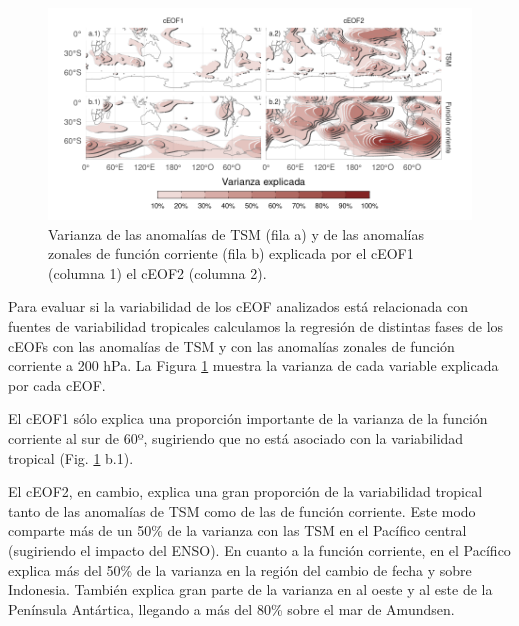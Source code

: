\documentclass[12pt,oneside,a4paper]{reedthesis}
\begin{document}
\begin{figure}

{\centering \includegraphics{figures/20-ceofs/psi-sst-explained-variance-1} 

}

\caption{Varianza de las anomalías de TSM (fila a) y de las anomalías zonales de función corriente (fila b) explicada por el cEOF1 (columna 1) el cEOF2 (columna 2).}\label{fig:psi-sst-explained-variance}
\end{figure}

Para evaluar si la variabilidad de los cEOF analizados está relacionada con fuentes de variabilidad tropicales calculamos la regresión de distintas fases de los cEOFs con las anomalías de TSM y con las anomalías zonales de función corriente a 200 hPa.
La Figura \ref{fig:psi-sst-explained-variance} muestra la varianza de cada variable explicada por cada cEOF.

El cEOF1 sólo explica una proporción importante de la varianza de la función corriente al sur de 60º, sugiriendo que no está asociado con la variabilidad tropical (Fig. \ref{fig:psi-sst-explained-variance} b.1).

El cEOF2, en cambio, explica una gran proporción de la variabilidad tropical tanto de las anomalías de TSM como de las de función corriente.
Este modo comparte más de un 50\% de la varianza con las TSM en el Pacífico central (sugiriendo el impacto del ENSO).
En cuanto a la función corriente, en el Pacífico explica más del 50\% de la varianza en la región del cambio de fecha y sobre Indonesia.
También explica gran parte de la varianza en al oeste y al este de la Península Antártica, llegando a más del 80\% sobre el mar de Amundsen.
\end{document}

